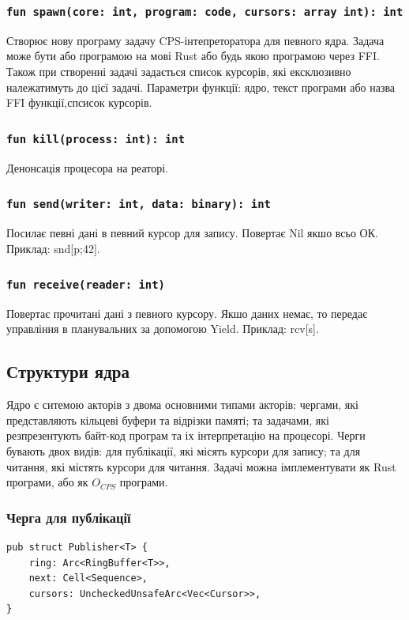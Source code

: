\subsubsection*{\lstinline{fun spawn(core: int, program: code, cursors: array int): int}}
Створює нову програму задачу CPS-інтепреторатора для певного ядра.
Задача може бути або програмою на мові Rust або будь якою програмою через FFI.
Також при створенні задачі задається список курсорів,
які ексклюзивно належатимуть до цієї задачі.
Параметри функції: ядро, текст програми або назва FFI функції,спсисок курсорів.

\subsubsection*{\lstinline{fun kill(process: int): int}}
Денонсація процесора на реаторі.

\subsubsection*{\lstinline{fun send(writer: int, data: binary): int}}
Посилає певні дані в певний курсор для запису. Повертає Nil якшо всьо ОК.
Приклад: snd[p;42].

\subsubsection*{\lstinline{fun receive(reader: int)}}
Повертає прочитані дані з певного курсору.
Якшо даних немає, то передає управління в планувальних за допомогою Yield.
Приклад: rcv[s].

\newpage
\subsection{Структури ядра}
Ядро є ситемою акторів з двома основними типами акторів:
чергами, які представляють кільцеві буфери та відрізки памяті;
та задачами, які резпрезентують байт-код програм та іх інтерпретацію на процесорі.
Черги бувають двох видів: для публікації, які місять курсори для запису;
та для читання, які містять курсори для читання. Задачі можна імплементувати
як Rust програми, або як $O_{CPS}$ програми.

\subsubsection{Черга для публікації}
\begin{lstlisting}
pub struct Publisher<T> {
    ring: Arc<RingBuffer<T>>,
    next: Cell<Sequence>,
    cursors: UncheckedUnsafeArc<Vec<Cursor>>,
}
\end{lstlisting}

